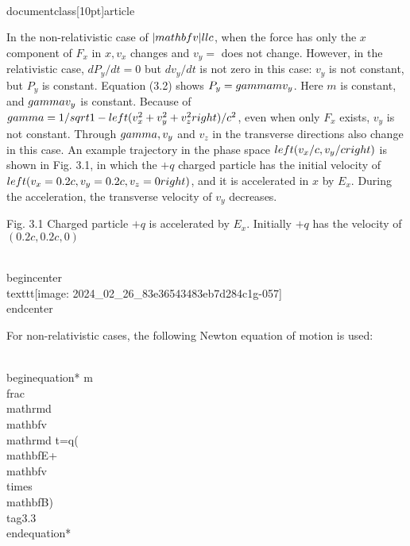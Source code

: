 \\documentclass[10pt]{article}
\begin{document}
In the non-relativistic case of $|\\mathbf{v}| \\ll c$, when the force has only the $x$ component of $F_{x}$ in $x, v_{x}$ changes and $v_{y}=$ does not change. However, in the relativistic case, $d P_{y} / d t=0$ but $d v_{y} / d t$ is not zero in this case: $v_{y}$ is not constant, but $P_{y}$ is constant. Equation (3.2) shows $P_{y}=\\gamma m v_{y}$. Here $m$ is constant, and $\\gamma v_{y}$ is constant. Because of $\\gamma=1 / \\sqrt{1-\\left(v_{x}^{2}+v_{y}^{2}+v_{z}^{2}\\right) / c^{2}}$, even when only $F_{x}$ exists, $v_{y}$ is not constant. Through $\\gamma, v_{y}$ and $v_{z}$ in the transverse directions also change in this case. An example trajectory in the phase space $\\left(v_{x} / c, v_{y} / c\\right)$ is shown in Fig. 3.1, in which the $+q$ charged particle has the initial velocity of $\\left(v_{x}=0.2 c, v_{y}=0.2 c, v_{z}=0\\right)$, and it is accelerated in $x$ by $E_{x}$. During the acceleration, the transverse velocity of $v_{y}$ decreases.

Fig. 3.1 Charged particle $+q$ is accelerated by $E_{x}$. Initially $+q$ has the velocity of $(0.2 c, 0.2 c, 0)$

\\begin{center}
\\texttt{[image: 2024\_02\_26\_83e36543483eb7d284c1g-057]}
\\end{center}

For non-relativistic cases, the following Newton equation of motion is used:


\\begin{equation*}
m \\frac{\\mathrm{d} \\mathbf{v}}{\\mathrm{d} t}=q(\\mathbf{E}+\\mathbf{v} \\times \\mathbf{B}) \\tag{3.3}
\\end{equation*}
\end{document}
